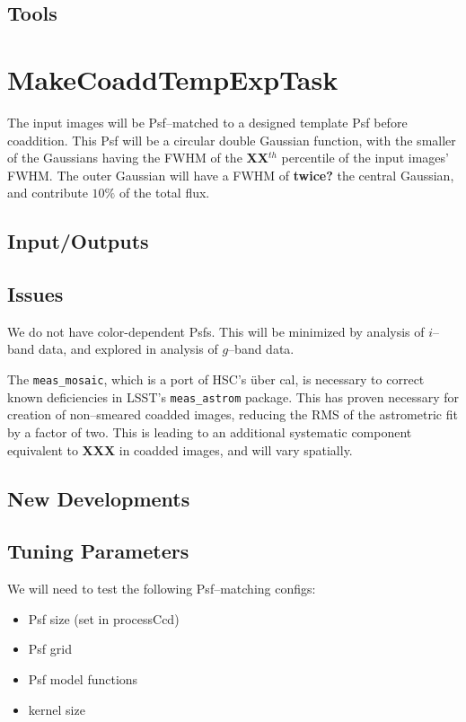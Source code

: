 \documentclass[12pt]{article}
\begin{document}
\subsection{Tools}


\clearpage 
\section{MakeCoaddTempExpTask} 

The input images will be Psf--matched to a designed template Psf
before coaddition.  This Psf will be a circular double Gaussian
function, with the smaller of the Gaussians having the FWHM of the
{\bf XX}$^{th}$ percentile of the input images' FWHM.  The outer
Gaussian will have a FWHM of {\bf twice?} the central Gaussian, and
contribute {\bf $10\%$} of the total flux.

\subsection{Input/Outputs}

\subsection{Issues}
We do not have color-dependent Psfs.  This will be minimized by
analysis of $i$--band data, and explored in analysis of $g$--band
data.

The {\tt meas\_mosaic}, which is a port of HSC's \"{u}ber cal, is
necessary to correct known deficiencies in LSST's {\tt meas\_astrom}
package.  This has proven necessary for creation of non--smeared
coadded images, reducing the RMS of the astrometric fit by a factor of
two.  This is leading to an additional systematic component equivalent
to {\bf XXX} in coadded images, and will vary spatially.

\subsection{New Developments}

\subsection{Tuning Parameters}
We will need to test the following Psf--matching configs:
\begin{itemize}
\item Psf size (set in processCcd)
\item Psf grid 
\item Psf model functions
\item kernel size
\end{itemize}
\end{document}
